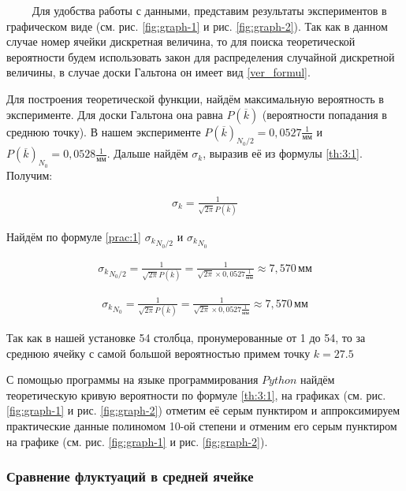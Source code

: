 $\qquad$ Для удобства работы с данными, представим результаты экспериментов в графическом виде (см. рис. \ref{fig:graph-1} и рис. \ref{fig:graph-2}). Так как в данном случае номер ячейки дискретная величина, то для поиска теоретической вероятности будем использовать закон для распределения случайной дискретной величины, в случае доски Гальтона он имеет вид \eqref{ver_formul}.

Для построения теоретической функции, найдём максимальную вероятность в эксперименте. Для доски Гальтона она равна $P(\overline{k})$ (вероятности попадания в среднюю точку). В нашем эксперименте $P(\overline{k})_{N_0/2} = 0,0527 \frac{1}{\text{мм}}$ и $P(\overline{k})_{N_0} = 0,0528 \frac{1}{\text{мм}}$. Дальше найдём $\sigma_k$, выразив её из формулы \eqref{th:3:1}. Получим:

\begin{align} \label{prac:1}
	\sigma_k = \frac{1}{\sqrt{2 \pi} P(\overline{k})} 
\end{align}

Найдём по формуле \eqref{prac:1} ${\sigma_k}_{N_0/2}$ и ${\sigma_k}_{N_0}$ 

\begin{align*}
	{\sigma_k}_{N_0/2} = \frac{1}{\sqrt{2 \pi} P(\overline{k})} = \frac{1}{\sqrt{2 \pi} \times 0,0527 \frac{1}{\text{мм}}} \approx 7,570 \, \text{мм}
\end{align*}

\begin{align*}
	{\sigma_k}_{N_0} = \frac{1}{\sqrt{2 \pi} P(\overline{k})} = \frac{1}{\sqrt{2 \pi} \times 0,0527 \frac{1}{\text{мм}}} \approx 7,570 \, \text{мм}
\end{align*}

Так как в нашей установке 54 столбца, пронумерованные от 1 до 54, то за среднюю ячейку с самой большой вероятностью примем точку $k = 27.5$ 

С помощью программы на языке программирования $Python$ найдём теоретическую кривую вероятности по формуле \eqref{th:3:1}, на графиках (см. рис. \ref{fig:graph-1} и рис. \ref{fig:graph-2}) отметим её серым пунктиром и аппроксимируем практические данные полиномом 10-ой степени и отменим его серым пунктиром на графике (см. рис. \ref{fig:graph-1} и рис. \ref{fig:graph-2}).

 

\subsubsection{Сравнение флуктуаций в средней ячейке}

